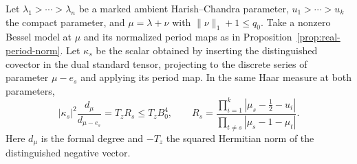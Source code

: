 \begin{auxlemma}
\label{lem:paired-lowering-factor}
Let \(\lambda_1>\cdots>\lambda_n\) be a marked ambient
Harish--Chandra parameter, \(u_1>\cdots>u_k\) the compact
parameter, and \(\mu=\lambda+\nu\) with
\(\|\nu\|_1+1\le q_0\). Take a nonzero Bessel model at \(\mu\)
and its normalized period maps as in
Proposition~\ref{prop:real-period-norm}. Let \(\kappa_s\) be the scalar
obtained by inserting the distinguished covector in the dual standard
tensor, projecting to the discrete series of parameter \(\mu-e_s\)
and applying its period map. In the same Haar measure at both parameters,
\[
 |\kappa_s|^2\frac{d_\mu}{d_{\mu-e_s}}
   =T_z R_s\le T_z B_0^4,\qquad
 R_s=\frac{\prod_{i=1}^k|\mu_s-\tfrac12-u_i|}
              {\prod_{t\ne s}|\mu_s-1-\mu_t|}.
\]
Here \(d_\mu\) is the formal degree and \(-T_z\) the squared
Hermitian norm of the distinguished negative vector.
\end{auxlemma}

